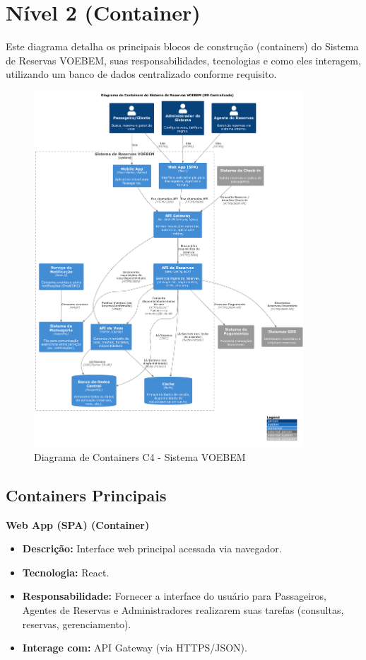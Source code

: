\section{Nível 2 (Container)}
\label{sec:c4-container}

Este diagrama detalha os principais blocos de construção (containers) do Sistema de Reservas VOEBEM, suas responsabilidades, tecnologias e como eles interagem, utilizando um banco de dados centralizado conforme requisito.

\begin{figure}[htbp]
    \centering
    \includegraphics[width=0.9\textwidth]{assets/c4-n2-container.pdf}
    \caption{Diagrama de Containers C4 - Sistema VOEBEM}
    \label{fig:c4-container}
\end{figure}

\subsection{Containers Principais}
\label{subsec:c4-container-principais}

\textbf{Web App (SPA) (Container)}
\begin{itemize}
    \item \textbf{Descrição:} Interface web principal acessada via navegador.
    \item \textbf{Tecnologia:} React.
    \item \textbf{Responsabilidade:} Fornecer a interface do usuário para Passageiros, Agentes de Reservas e Administradores realizarem suas tarefas (consultas, reservas, gerenciamento).
    \item \textbf{Interage com:} API Gateway (via HTTPS/JSON).
\end{itemize}

